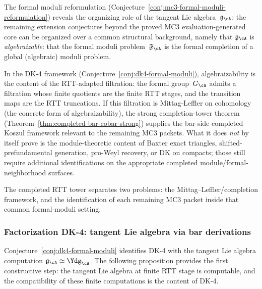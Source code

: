 \begin{remark}
\label{rem:tangent-controls-extension}
The formal moduli reformulation
(Conjecture~\ref{conj:mc3-formal-moduli-reformulation})
reveals the organizing role of the tangent Lie
algebra~$\mathfrak{g}_{\cA}$: the remaining extension
conjectures beyond the proved MC3 evaluation-generated core can be organized over a common structural background,
namely that $\mathfrak{g}_{\cA}$ is \emph{algebraizable}:
that the formal moduli problem~$\mathfrak{F}_{\cA}$ is the
formal completion of a global (algebraic) moduli problem.

In the DK-4 framework
(Conjecture~\ref{conj:dk4-formal-moduli}), algebraizability is the
content of the RTT-adapted filtration: the formal
group~$G_{\cA}$ admits a filtration whose finite quotients are
the finite RTT stages, and the transition maps are the RTT
truncations. If this filtration is Mittag-Leffler on cohomology
(the concrete form of algebraizability), the strong
completion-tower theorem
\textup{(}Theorem~\ref{thm:completed-bar-cobar-strong}\textup{)}
supplies the bar-side completed Koszul framework relevant to the
remaining MC3 packets. What it does \emph{not} by itself prove is
the module-theoretic content of Baxter exact triangles,
shifted-prefundamental generation, pro-Weyl recovery, or DK on
compacts; those still require additional identifications on the
appropriate completed module/formal-neighborhood surfaces.

The completed RTT tower separates two problems: the
Mittag--Leffler/completion framework, and the identification of each
remaining MC3 packet inside that common formal-moduli setting.
\end{remark}

\subsubsection*{Factorization DK-4: tangent Lie algebra via
bar derivations}

Conjecture~\ref{conj:dk4-formal-moduli} identifies DK-4 with the
tangent Lie algebra computation
$\mathfrak{g}_{\cA} \simeq \Ydg_{\cA}$.
The following proposition provides the first constructive step:
the tangent Lie algebra at finite RTT stage is computable,
and the compatibility of these finite computations is the
content of DK-4.

